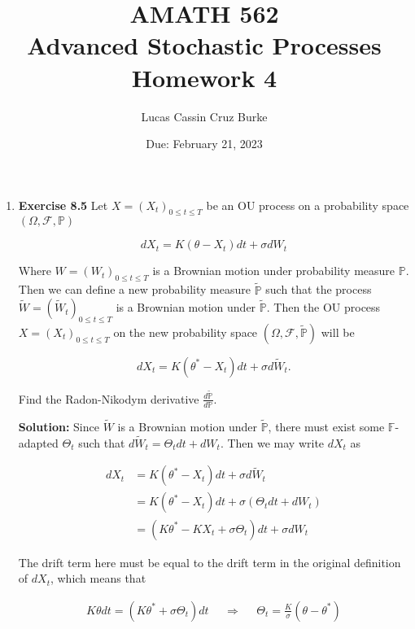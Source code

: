\documentclass[12pt, a4paper]{article}
\begin{document}
\title{{AMATH 562\\
Advanced Stochastic Processes}\\
{\bf \Huge Homework 4}}

\author{Lucas Cassin Cruz Burke}

\date{Due: February 21, 2023}

\maketitle

\begin{enumerate}
    \item \textbf{Exercise 8.5} Let $X=(X_t)_{0 \le t \le T}$ be an OU process on a probability space $(\Omega, \mathcal F, \mathbb P)$
    
    $$dX_t = K(\theta - X_t)dt + \sigma dW_t$$

    Where $W=(W_t)_{0 \le t \le T}$ is a Brownian motion under probability measure $\mathbb P$. Then we can define a new probability measure $\tilde{\mathbb P}$ such that the process $\tilde W = (\tilde W_t)_{0 \le t \le T}$ is a Brownian motion under $\tilde{\mathbb P}$. Then the OU process $X=(X_t)_{0\le t\le T}$ on the new probability space $(\Omega, \mathcal F, \tilde{\mathbb{P}})$ will be 

    $$dX_t = K(\theta^* - X_t)dt + \sigma d\tilde W_t.$$

    Find the Radon-Nikodym derivative $\frac{d \tilde{\mathbb P}}{d \mathbb P}$.

    \textbf{Solution:} Since $\tilde W$ is a Brownian motion under $\tilde{\mathbb P}$, there must exist some $\mathbb F$-adapted $\Theta_t$ such that $d\tilde W_t = \Theta_t dt + dW_t$. Then we may write $dX_t$ as 

    \begin{align*}
        dX_t &= K(\theta^* - X_t) dt + \sigma d\tilde W_t \\
        &= K(\theta^* - X_t)dt + \sigma (\Theta_t dt + dW_t) \\
        &= (K\theta^* - KX_t + \sigma \Theta_t) dt + \sigma dW_t
    \end{align*}

    The drift term here must be equal to the drift term in the original definition of $dX_t$, which means that

    \begin{align*}
        K\theta dt = (K\theta^* + \sigma \Theta_t) dt && \Rightarrow && \Theta_t = \frac{K}{\sigma} (\theta - \theta^*)
    \end{align*}


\end{enumerate}
\end{document}

